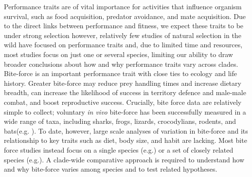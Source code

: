 \documentclass[a4paper, 12pt]{article}
\begin{document}
Performance traits are of vital importance for activities that influence organism survival, such as food acquisition, predator avoidance, and mate acquisition\cite{lailvaux2004performance,legalliard2004,lappin2005weapon,irschick2008}. 
Due to the direct links between performance and fitness, we expect these traits to be under strong selection\cite{arnold1983,irschick2008} however, relatively few studies of natural selection in the wild have focused on performance traits\cite{irschick2008,kingsolver2012} and, due to limited time and resources, most studies focus on just one or several species, limiting our ability to draw broader conclusions about how and why performance traits vary across clades\cite{irschick2008}. 
Bite-force is an important performance trait with close ties to ecology and life history\cite{herrel1999morphology,anderson2008bite,erickson2014comparative,lappin2014reliable,husak2009fitness}. 
Greater bite-force may reduce prey handling times and increase dietary breadth\cite{herrel1999morphology,herrel2004omnivory,verwaijen2002relationships,van2006seed,taverne2020proximate}, can increase the likelihood of success in territory defence and male-male combat\cite{lailvaux2004performance,lappin2005weapon,huyghe2005morphology,husak2006bite}, and boost reproductive success\cite{lappin2005weapon,husak2006bite,husak2009fitness}.
Crucially, bite force data are relatively simple to collect; voluntary \textit{in vivo} bite-force has been successfully measured in a wide range of taxa, including sharks, frogs, lizards, crocodylians, rodents, and bats(e.g. \cite{herrel1999morphology,huber2005analysis,santana2010mechanics,becerra2013biting,erickson2014comparative,lappin2014reliable,lappin2017bite}). 
To date, however, large scale analyses of variation in bite-force and its relationship to key traits such as diet, body size, and habit are lacking. 
Most bite force studies instead focus on a single species (e.g.\cite{husak2006bite}) or a set of closely related species (e.g.\cite{taverne2020proximate}).
A clade-wide comparative approach is required to understand how and why bite-force varies among species and to test related hypotheses.
\end{document}
